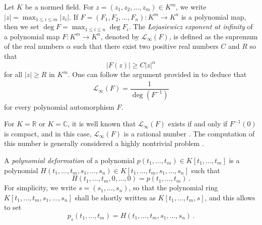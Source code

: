 \documentclass{amsart}
\begin{document}
Let $K$ be a normed field. For $z=(z_1,z_2,\dots,z_m)\in K^m$, we write $|z|=\max_{1\leq i\leq m}|z_i|$. If $F=(F_1,F_2,\dots,F_n)\colon K^m\to K^n$  is a polynomial map, then we set $\deg F=\max_{1\leq i\leq n}\deg F_i$. 
The {\em \L{}ojasiewicz exponent at infinity} of a polynomial map $F\colon K^m\to K^n$, denoted by $\mathcal{L}_{\infty}(F)$, is defined as the supremum of the real numbers $\alpha$ such that there exist two positive real numbers $C$ and $R$ so that 
$$|F(z)|\geq C|z|^{\alpha}$$
for all $|z|\geq R$ in $K^m$. One can follow the argument provided in \cite[(1.1)]{Plos85} to deduce that  
\begin{align}\label{Loj}
	\mathcal{L}_{\infty}(F)=\dfrac{1}{\deg (F^{-1})}
\end{align}
for every polynomial automorphism $F$.

For   $K=\mathbb{R}$ or $K=\mathbb{C}$, it is well known that  $\mathcal{L}_{\infty}(F)$ exists if and only if $F^{-1}(0)$ is compact, and in this case, $\mathcal{L}_{\infty}(F)$ is a rational number  \cite[Proposition 2.6]{Kra07}. The computation of this number is generally considered a highly nontrivial problem \cite{CKT, Len, Plos85,BiviaMZ, BH}.   

A {\em polynomial deformation} of a polynomial $p(t_1,\dots, t_m)\in K[t_1,\dots, t_m]$ is a polynomial   $H(t_1,\dots, t_m, s_1,\dots, s_n)\in K[t_1,\dots, t_m, s_1,\dots, s_n]$ such that $$H(t_1,\dots, t_m, 0,\dots, 0)=p(t_1,\dots, t_m)\,.$$
For simplicity, we write $s=(s_1,\dots, s_n)$, so that the polynomial ring $K[t_1,\dots, t_m, s_1,\dots, s_n]$ shall be shortly written as $K[t_1,\dots, t_m, s]$, and this allows to set $$p_s(t_1,\dots, t_m)=H(t_1,\dots, t_m, s_1,\dots, s_n)\,.$$    
\end{document}
